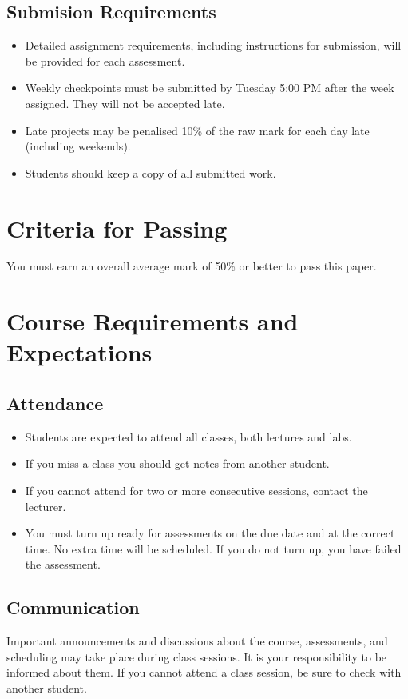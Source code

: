 \documentclass{article}
\begin{document}
\subsection*{Submision Requirements}
\begin{itemize}
	\item Detailed assignment requirements, including instructions for submission, will be provided for each assessment.
        \item Weekly checkpoints must be submitted by Tuesday 5:00 PM after the week assigned. They will not be accepted late.
	\item Late projects may be penalised 10\% of the raw mark for each day late (including weekends).
	\item Students should keep a copy of all submitted work.
\end{itemize}

\section*{Criteria for Passing}
You must earn an overall average mark of 50\% or better to pass this paper.

\section*{Course Requirements and Expectations}
\subsection*{Attendance}
\begin{itemize}
 \item Students are expected to attend all classes, both lectures and labs.
 \item If you miss a class you should get notes from another student.
 \item If you cannot attend for two or more consecutive sessions, contact the lecturer.
 \item You must turn up ready for assessments on the due date and at the correct time. No extra time will be scheduled. If you do not turn up, you have failed the assessment.
\end{itemize}

\subsection*{Communication}
Important announcements and discussions about the course, assessments, and scheduling may take place during class sessions.  It is your responsibility to be informed about them.  If you cannot attend a class session, be sure to check with another student.
\end{document}

